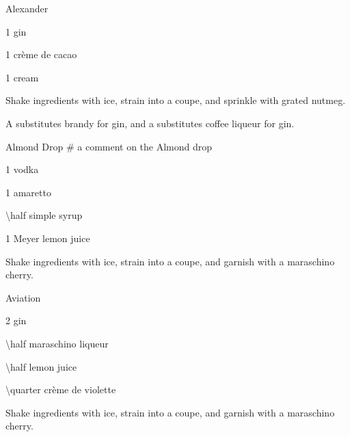 \begin{Cocktail}{Alexander}
	\begin{Ingredients}
	\item \SI{1}{\oz} gin
	\item \SI{1}{\oz} cr\`{e}me de cacao
	\item \SI{1}{\oz} cream
	\end{Ingredients}
	
	\begin{Instructions}
	Shake ingredients with ice, strain into a coupe, and sprinkle with grated nutmeg.
	
	A  substitutes brandy for gin, and a  substitutes coffee liqueur for gin.
	\end{Instructions}
\end{Cocktail}

\begin{Cocktail*}{Almond Drop} # a comment on the Almond drop
	\begin{Ingredients}
	\item \SI{1}{\oz} vodka
	\item \SI{1}{\oz} amaretto
	\item \SI{\half}{\oz} simple syrup
	\item \SI{1}{\oz} Meyer lemon juice
	\end{Ingredients}
	
	\begin{Instructions}
	Shake ingredients with ice, strain into a coupe, and garnish with a maraschino cherry.
	\end{Instructions}
\end{Cocktail*}

\begin{Cocktail}{Aviation}
	\begin{Ingredients}
	\item \SI{2}{\oz} gin
	\item \SI{\half}{\oz} maraschino liqueur
	\item \SI{\half}{\oz} lemon juice
	\item \SI{\quarter}{\oz} cr\`{e}me de violette
	\end{Ingredients}
	
	\begin{Instructions}
	Shake ingredients with ice, strain into a coupe, and garnish with a maraschino cherry.
	\end{Instructions}
\end{Cocktail}

